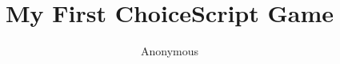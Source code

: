 \documentclass{book}
\begin{document}
\date{}
\title{
My
First
ChoiceScript
Game
}\author{
Anonymous
}\maketitle
\end{document}
